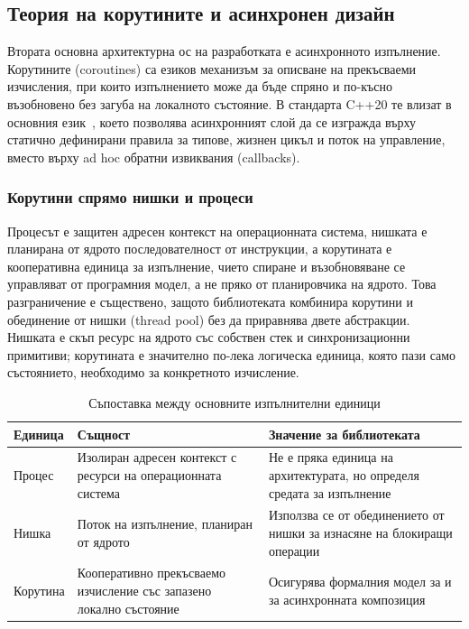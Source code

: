 \subsection{Теория на корутините и асинхронен дизайн}
\label{subsec:coroutines_design}

Втората основна архитектурна ос на разработката е асинхронното изпълнение. Корутините (coroutines) са езиков механизъм за описване на прекъсваеми изчисления, при които изпълнението може да бъде спряно и по-късно възобновено без загуба на локалното състояние. В стандарта C++20 те влизат в основния език~\cite{cpp20standard,p0912r5,p1063r0}, което позволява асинхронният слой да се изгражда върху статично дефинирани правила за типове, жизнен цикъл и поток на управление, вместо върху ad hoc обратни извиквания (callbacks).

\subsubsection{Корутини спрямо нишки и процеси}

Процесът е защитен адресен контекст на операционната система, нишката е планирана от ядрото последователност от инструкции, а корутината е кооперативна единица за изпълнение, чието спиране и възобновяване се управляват от програмния модел, а не пряко от планировчика на ядрото. Това разграничение е съществено, защото библиотеката комбинира корутини и обединение от нишки (thread pool) без да приравнява двете абстракции. Нишката е скъп ресурс на ядрото със собствен стек и синхронизационни примитиви; корутината е значително по-лека логическа единица, която пази само състоянието, необходимо за конкретното изчисление.

\begin{table}[H]
\centering
\small
\caption{Съпоставка между основните изпълнителни единици}
\label{tab:execution_units_comparison}
\begin{tabularx}{\textwidth}{L{2.8cm}L{4.0cm}Y}
\toprule
\textbf{Единица} & \textbf{Същност} & \textbf{Значение за библиотеката} \\
\midrule
Процес & Изолиран адресен контекст с ресурси на операционната система & Не е пряка единица на архитектурата, но определя средата за изпълнение \\
\hdashline
Нишка & Поток на изпълнение, планиран от ядрото & Използва се от обединението от нишки за изнасяне на блокиращи операции \\
\hdashline
Корутина & Кооперативно прекъсваемо изчисление със запазено локално състояние & Осигурява формалния модел за  и за асинхронната композиция \\
\bottomrule
\end{tabularx}
\end{table}

